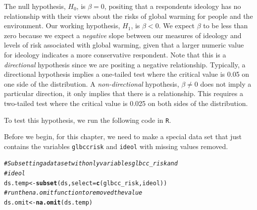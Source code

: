 \documentclass[11pt,openany]{book}\usepackage[]{graphicx}\usepackage[]{color}
\makeatletter
\newcommand{\hlcom}[1]{\textcolor[rgb]{0.678,0.584,0.686}{\textit{#1}}}%
\newcommand{\hlstd}[1]{\textcolor[rgb]{0.345,0.345,0.345}{#1}}%
\newcommand{\hlkwb}[1]{\textcolor[rgb]{0.69,0.353,0.396}{#1}}%
\newcommand{\hlkwc}[1]{\textcolor[rgb]{0.333,0.667,0.333}{#1}}%
\newcommand{\hlkwd}[1]{\textcolor[rgb]{0.737,0.353,0.396}{\textbf{#1}}}%
\newenvironment{kframe}{%
 \def\at@end@of@kframe{}%
 \ifinner\ifhmode%
  \def\at@end@of@kframe{\end{minipage}}%
  \begin{minipage}{\columnwidth}%
 \fi\fi%
 \def\FrameCommand##1{\hskip\@totalleftmargin \hskip-\fboxsep
 \colorbox{shadecolor}{##1}\hskip-\fboxsep
     \hskip-\linewidth \hskip-\@totalleftmargin \hskip\columnwidth}%
 \MakeFramed {\advance\hsize-\width
   \@totalleftmargin\z@ \linewidth\hsize
   \@setminipage}}%
 {\par\unskip\endMakeFramed%
 \at@end@of@kframe}
\newenvironment{knitrout}{}{} %
\renewenvironment{knitrout}{\begin{singlespace}}{\end{singlespace}} %
\makeatother
\begin{document}
The null hypothesis, $H_{0}$, is $\beta = 0$, positing that a respondents ideology has no relationship with their views about the risks of global warming for people and the environment. Our working hypothesis, $H_{1}$, is $\beta < 0$. We expect $\beta$ to be less than zero because we expect a \textit{negative} slope between our measures of ideology and levels of risk associated with global warming, given that a larger numeric value for ideology indicates a more conservative respondent. Note that this is a \textit{directional} hypothesis since we are positing a negative relationship. Typically, a directional hypothesis implies a one-tailed test where the critical value is 0.05 on one side of the distribution. A \textit{non-directional} hypothesis, $\beta \neq 0$ does not imply a particular direction, it only implies that there is a relationship. This requires a two-tailed test where the critical value is 0.025 on both sides of the distribution.  

To test this hypothesis, we run the following code in \texttt{R}. 

Before we begin, for this chapter, we need to make a special data set that just contains the variables \texttt{glbccrisk} and \texttt{ideol} with missing values removed.

\begin{knitrout}
\color{fgcolor}\begin{kframe}
\begin{alltt}
\hlcom{# Subsetting a data set with only variables glbcc_risk and}
\hlcom{# ideol}
\hlstd{ds.temp} \hlkwb{<-} \hlkwd{subset}\hlstd{(ds,} \hlkwc{select} \hlstd{=} \hlkwd{c}\hlstd{(glbcc_risk, ideol))}
\hlcom{# run the na.omit function to removed the value}
\hlstd{ds.omit} \hlkwb{<-} \hlkwd{na.omit}\hlstd{(ds.temp)}
\end{alltt}
\end{kframe}
\end{knitrout}
\end{document}
